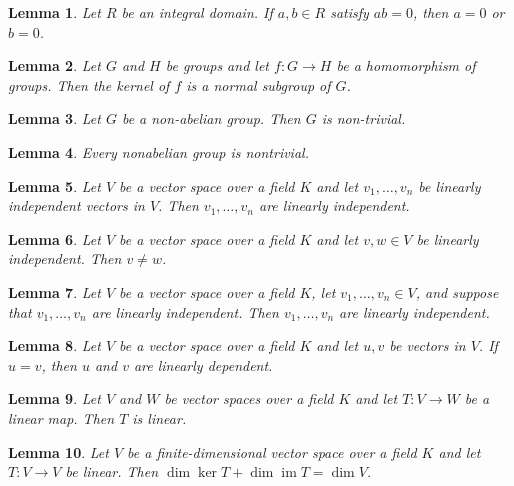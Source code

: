 \documentclass{article}
\newtheorem{lemma}{Lemma}
\begin{document}
\begin{lemma}\label{domain-satisfy}
Let $R$ be an integral domain. If $a,b\in R$ satisfy $ab=0$, then $a=0$ or $b=0$.
\end{lemma}

\begin{lemma}\label{kernel-trivial}
Let $G$ and $H$ be groups and let $f\colon G\to H$ be a homomorphism of groups. Then the kernel of $f$ is a normal subgroup of $G$.
\end{lemma}

\begin{lemma}\label{non-abelian}
Let $G$ be a non-abelian group. Then $G$ is non-trivial.
\end{lemma}

\begin{lemma}\label{nonabelian}
Every nonabelian group is nontrivial.
\end{lemma}

\begin{lemma}\label{independent-family}
Let $V$ be a vector space over a field $K$ and let $v_1,\ldots,v_n$ be linearly independent vectors in $V$. Then $v_1,\ldots,v_n$ are linearly independent.
\end{lemma}

\begin{lemma}\label{independent-pair}
Let $V$ be a vector space over a field $K$ and let $v,w\in V$ be linearly independent. Then $v\ne w$.
\end{lemma}

\begin{lemma}\label{let-suppose}
Let $V$ be a vector space over a field $K$, let $v_1,\ldots,v_n\in V$, and suppose that $v_1,\ldots,v_n$ are linearly independent. Then $v_1,\ldots,v_n$ are linearly independent.
\end{lemma}

\begin{lemma}\label{dependent-pair}
Let $V$ be a vector space over a field $K$ and let $u,v$ be vectors in $V$. If $u=v$, then $u$ and $v$ are linearly dependent.
\end{lemma}

\begin{lemma}\label{one-field}
Let $V$ and $W$ be vector spaces over a field $K$ and let $T\colon V\to W$ be a linear map. Then $T$ is linear.
\end{lemma}

\begin{lemma}\label{rank-nullity}
Let $V$ be a finite-dimensional vector space over a field $K$ and let $T\colon V\to V$ be linear. Then $\dim\ker T+\dim\operatorname{im}T=\dim V$.
\end{lemma}
\end{document}

